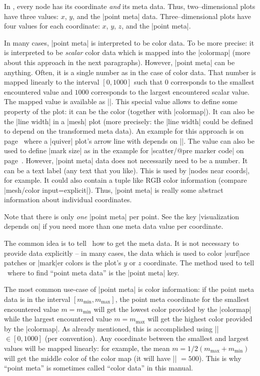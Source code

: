 In \PGFPlots, every node has its coordinate \emph{and} its meta data. Thus, two--dimensional plots have three values: $x$, $y$, and the |point meta| data. Three--dimensional plots have four values for each coordinate: $x$, $y$, $z$, and the |point meta|. 

In many cases, |point meta| is interpreted to be color data. To be more precise: it is interpreted to be \emph{scalar} color data which is mapped into the |colormap| (more about this approach in the next paragraphs). However, |point meta| can be anything. Often, it is a single number as in the case of color data. That number is mapped linearly to the interval $[0,1000]$ such that $0$ corresponds to the smallest encountered value and $1000$ corresponds to the largest encountered scalar value. The mapped value is available as |\pgfplotspointmetatransformed|. This special value allows to define some property of the plot: it can be the color (together with |colormap|). It can also be the |line width| in a |mesh| plot (more precisely: the |line width| could be defined to depend on the transformed meta data). An example for this approach is on page~\pageref{pgfplots:example:pointmeta:quiver} where a |quiver| plot's arrow line with depends on |\pgfplotspointmetatransformed|. The value can also be used to define |mark size| as in the example for |scatter/@pre marker code| on page~\pageref{pgfplots:example:pointmeta:scatter}. However, |point meta| data does not necessarily need to be a number. It can be a text label (any text that you like). This is used by |nodes near coords|, for example. It could also contain a tuple like RGB color information (compare |mesh/color input=explicit|). Thus, |point meta| is really some abstract information about individual coordinates.

Note that there is only \emph{one} |point meta| per point. See the key |visualization depends on| if you need more than one meta data value per coordinate. 

The common idea is to tell \PGFPlots\ how to get the meta data. It is not necessary to provide data explicitly -- in many cases, the data which is used to color |surf|ace patches or |mark|er colors is the plot's $y$ or $z$ coordinate. The method used to tell \PGFPlots\ where to find ``point meta data'' is the |point meta| key. 

The most common use-case of |point meta| is color information: if the point meta data is in the interval $[m_{\text{min}},m_{\text{max}}]$, the point meta coordinate for the smallest encountered value $m = m_{\text{min}}$ will get the lowest color provided by the |colormap| while the largest encountered value $m=m_{\text{max}}$ will get the highest color provided by the |colormap|. As already mentioned, this is accomplished using |\pgfplotspointmetatransformed| $\in [0,1000]$ (per convention). Any coordinate between the smallest and largest values will be mapped linearly: for example, the mean $m = 1/2 (m_{\text{max}} + m_{\text{min}})$ will get the middle color of the color map (it will have |\pgfplotspointmetatransformed| $=500$). This is why ``point meta'' is sometimes called ``color data'' in this manual.


